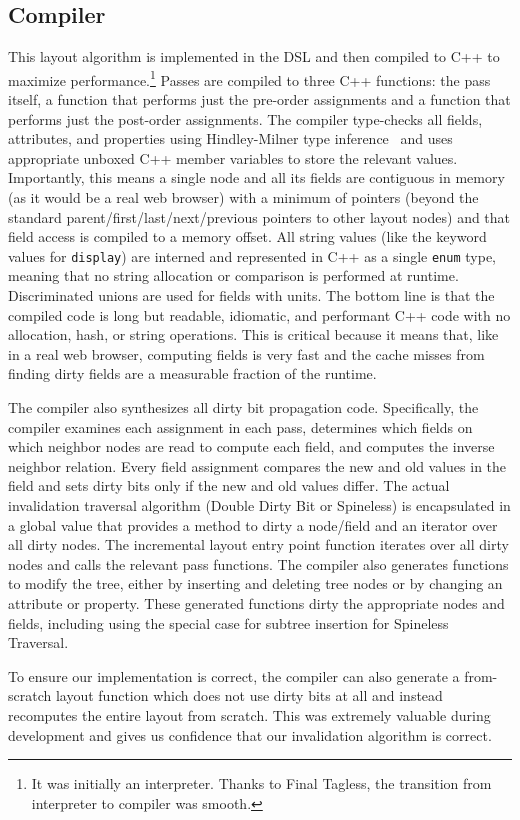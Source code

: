 \subsection{Compiler}
\label{sec-compiler}
This layout algorithm is implemented in the DSL
  and then compiled to C++ to maximize performance.\footnote{It was initially an interpreter. Thanks to Final Tagless\cite{FTG}, the transition from interpreter to compiler was smooth.}
Passes are compiled to three C++ functions:
  the pass itself,
  a function that performs just the pre-order assignments
  and a function that performs just the post-order assignments.
The compiler type-checks all fields, attributes, and properties
  using Hindley-Milner type inference~\cite{HM}
  and uses appropriate unboxed C++ member variables
  to store the relevant values.
Importantly, this means a single node and all its fields
  are contiguous in memory
  (as it would be a real web browser)
  with a minimum of pointers
  (beyond the standard parent/first/last/next/previous pointers
  to other layout nodes)
  and that field access is compiled to a memory offset.
All string values (like the keyword values for \texttt{display})
  are interned and represented in C++ as
  a single \texttt{enum} type,
  meaning that no string allocation or comparison
  is performed at runtime.
Discriminated unions are used for fields with units.
The bottom line is that the compiled code is
  long but readable, idiomatic, and performant C++ code
  with no allocation, hash, or string operations.
This is critical because it means that,
  like in a real web browser,
  computing fields is very fast
  and the cache misses from finding dirty fields
  are a measurable fraction of the runtime.

The compiler also synthesizes all
  dirty bit propagation code.
Specifically, the compiler examines
  each assignment in each pass,
  determines which fields on which neighbor nodes are read
  to compute each field,
  and computes the inverse neighbor relation.
Every field assignment
  compares the new and old values in the field
  and sets dirty bits only if the new and old values differ.
The actual invalidation traversal algorithm
  (Double Dirty Bit or Spineless)
  is encapsulated in a global value
  that provides a method to dirty a node/field
  and an iterator over all dirty nodes.
The incremental layout entry point function
  iterates over all dirty nodes
  and calls the relevant pass functions.
The compiler also generates functions to modify the tree,
  either by inserting and deleting tree nodes
  or by changing an attribute or property.
These generated functions dirty the appropriate nodes and fields,
  including using the special case for subtree insertion
  for Spineless Traversal.

To ensure our implementation is correct,
  the compiler can also generate a from-scratch layout function
  which does not use dirty bits at all
  and instead recomputes the entire layout from scratch.
This was extremely valuable during development
  and gives us confidence that our invalidation algorithm is correct.
